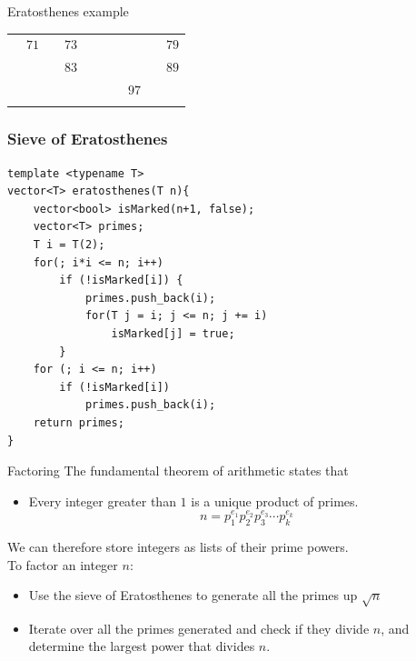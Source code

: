 \documentclass{beamer}
\begin{document}
\begin{frame}[plain]{Eratosthenes example}
{\begin{tabular}{r r r r r r r r r r}
			                   & \color{black} $71$ &                    & \color{black} $73$ &                    &                    &                    &                    &                    & \color{black} $79$\\
			                   &                    &                    & \color{black} $83$ &                    &                    &                    &                    &                    & \color{black} $89$\\
			                   &                    &                    &                    &                    &                    &                    & \color{black} $97$ &                    &                   \\
			\phantom{$888$} & \phantom{$888$} & \phantom{$888$} & \phantom{$888$} & \phantom{$888$} & \phantom{$888$} & \phantom{$888$} & \phantom{$888$} & \phantom{$888$} & \phantom{$888$}
        \end{tabular}
	}
\end{frame}

\begin{frame}
  \frametitle{Sieve of Eratosthenes}
      \begin{verbatim}
template <typename T>
vector<T> eratosthenes(T n){
    vector<bool> isMarked(n+1, false);
    vector<T> primes;
    T i = T(2);
    for(; i*i <= n; i++)
        if (!isMarked[i]) {
            primes.push_back(i);
            for(T j = i; j <= n; j += i)
                isMarked[j] = true;
        }
    for (; i <= n; i++)
        if (!isMarked[i])
            primes.push_back(i);
    return primes;
}
    \end{verbatim}
\end{frame}


\begin{frame}[plain]{Factoring}
  \vspace{10pt}
  The fundamental theorem of arithmetic states that
  \begin{itemize}
    \item Every integer greater than $1$ is a unique product of primes.
    \[
      n = p_1^{e_1}p_2^{e_2}p_3^{e_3}\cdots p_k^{e_k}
    \]
  \end{itemize}
  We can therefore store integers as lists of their prime powers. \\
  \vspace{10pt}
  To factor an integer $n$:
  \begin{itemize}
    \item Use the sieve of Eratosthenes to generate all the primes up
      $\sqrt{n}$
    \item Iterate over all the primes generated and check if they divide $n$,
      and determine the largest power that divides $n$.
  \end{itemize}
\end{frame}
\end{document}
